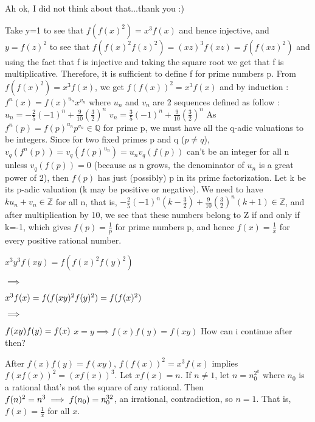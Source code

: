 \begin{solution}
	Ah ok, I did not think about that...thank you :)
\end{solution}



\begin{solution}
	Take y=1 to see that $f(f(x)^2)=x^3f(x)$ and hence injective, and $y=f(z)^2$ to see that $f(f(x)^2f(z)^2)=(xz)^3f(xz)=f(f(xz)^2)$ and using the fact that f is injective and taking the square root we get that f is multiplicative.
Therefore, it is sufficient to define f for prime numbers p.
From $f(f(x)^2)=x^3f(x)$, we get $f(f(x))^2 = x^3 f(x)$ and by induction : $f^n(x)=f(x)^{u_n}x^{v_n}$ where $u_n$ and $v_n$ are 2 sequences defined as follow : 
$u_n = -\frac{2}{5}(-1)^n + \frac{9}{10}(\frac{3}{2})^n$
$v_n = \frac{3}{5}(-1)^n + \frac{9}{10}(\frac{3}{2})^n$
As $f^n(p)=f(p)^{u_n}p^{v_n} \in \mathbb{Q}$ for prime p, we must have all the q-adic valuations to be integers.
Since for two fixed primes p and q ($p \neq q$), $v_q(f^n(p)) = v_q(f(p)^{u_n})=u_n v_q(f(p))$ can't be an integer for all n unless $v_q(f(p))=0$ (because as n grows, the denominator of $u_n$ is a great power of 2), then $f(p)$ has just (possibly) p in its prime factorization. Let k be its p-adic valuation (k may be positive or negative). We need to have $ku_n + v_n \in \mathbb{Z}$ for all n, that is, $-\frac{2}{5}(-1)^n(k-\frac{3}{2}) + \frac{9}{10}(\frac{3}{2})^n(k+1) \in \mathbb{Z}$, and after multiplication by 10, we see that these numbers belong to Z if and only if k=-1, which gives $f(p)=\frac{1}{p}$ for prime numbers p, and hence $f(x)=\frac{1}{x}$ for every positive rational number.
\end{solution}



\begin{solution}
	$ x^3y^3f(xy)=f(f(x)^2f(y)^2) $

$ \implies $

$ x^3f(x)=f(f(x\/y)^2f(y)^2)=f(f(x)^2) $

$ \implies $

$ f(x\/y)f(y)=f(x) $
$ x=y  \implies  f(x)f(y)=f(xy) $
How can i continue after then?
\end{solution}



\begin{solution}
	After $f(x)f(y)=f(xy)$, $f(f(x))^2=x^3 f(x)$ implies $f(xf(x))^2=(xf(x))^3$. Let $xf(x)=n$. If $n\ne 1$, let $n=n_0^{2^k}$ where $n_0$ is a rational that's not the square of any rational. Then $f(n)^2=n^3 \implies f(n_0)=n_0^{3\/2}$, an irrational, contradiction, so $n=1$. That is, $f(x)=\frac{1}{x}$ for all $x$.
\end{solution}



